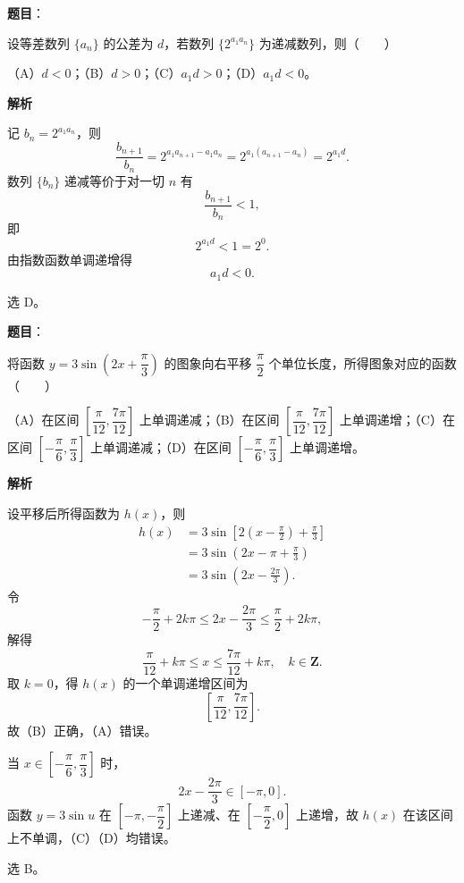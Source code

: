 \begin{answer}

\textbf{题目}：

设等差数列 $\{a_n\}$ 的公差为 $d$，若数列 $\{2^{a_1a_n}\}$ 为递减数列，则\mbox{（　　）}

（A）$d<0$；（B）$d>0$；（C）$a_1d>0$；（D）$a_1d<0$。

\textbf{解析}

记 $b_n=2^{a_1a_n}$，则
\nopagebreak[4]
\[\frac{b_{n+1}}{b_n}
=2^{a_1a_{n+1}-a_1a_n}
=2^{a_1(a_{n+1}-a_n)}
=2^{a_1d}.\]
数列 $\{b_n\}$ 递减等价于对一切 $n$ 有
\nopagebreak[4]
\[\frac{b_{n+1}}{b_n}<1,\]
即
\nopagebreak[4]
\[2^{a_1d}<1=2^0.\]
由指数函数单调递增得
\nopagebreak[4]
\[a_1d<0.\]

选 D。


\end{answer}
\begin{answer}

\textbf{题目}：

将函数 $y=3\sin\left(2x+\dfrac\pi3\right)$ 的图象向右平移 $\dfrac\pi2$ 个单位长度，所得图象对应的函数\mbox{（　　）}

（A）在区间 $\left[\dfrac\pi{12},\dfrac{7\pi}{12}\right]$ 上单调递减；（B）在区间 $\left[\dfrac\pi{12},\dfrac{7\pi}{12}\right]$ 上单调递增；（C）在区间 $\left[-\dfrac\pi6,\dfrac\pi3\right]$ 上单调递减；（D）在区间 $\left[-\dfrac\pi6,\dfrac\pi3\right]$ 上单调递增。

\textbf{解析}

设平移后所得函数为 $h(x)$，则
\nopagebreak[4]
\[\begin{aligned}
h(x)&=3\sin\left[2\left(x-\frac\pi2\right)+\frac\pi3\right]\\
&=3\sin\left(2x-\pi+\frac\pi3\right)\\
&=3\sin\left(2x-\frac{2\pi}3\right).
\end{aligned}\]
令
\nopagebreak[4]
\[-\frac\pi2+2k\pi\leqslant 2x-\frac{2\pi}3\leqslant\frac\pi2+2k\pi,\]
解得
\nopagebreak[4]
\[\frac\pi{12}+k\pi\leqslant x\leqslant\frac{7\pi}{12}+k\pi,\quad k\in\mathbf Z.\]
取 $k=0$，得 $h(x)$ 的一个单调递增区间为
\nopagebreak[4]
\[\left[\frac\pi{12},\frac{7\pi}{12}\right].\]
故（B）正确，（A）错误。

当 $x\in\left[-\dfrac\pi6,\dfrac\pi3\right]$ 时，
\nopagebreak[4]
\[2x-\frac{2\pi}3\in\left[-\pi,0\right].\]
函数 $y=3\sin u$ 在 $\left[-\pi,-\dfrac\pi2\right]$ 上递减、在 $\left[-\dfrac\pi2,0\right]$ 上递增，故 $h(x)$ 在该区间上不单调，（C）（D）均错误。

选 B。


\end{answer}
